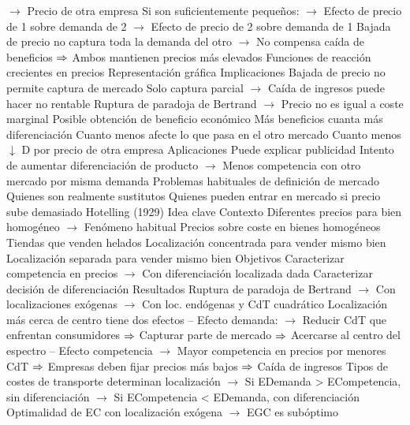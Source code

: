 \documentclass{nuevotema}
\begin{document}
\begin{esquemal}
				\4[] $\to$ Precio de otra empresa
				\4[] Si son suficientemente pequeños:
				\4[] $\to$ Efecto de precio de 1 sobre demanda de 2
				\4[] $\to$ Efecto de precio de 2 sobre demanda de 1
				\4[] Bajada de precio no captura toda la demanda del otro
				\4[] $\to$ No compensa caída de beneficios
				\4[] $\Rightarrow$ Ambos mantienen precios más elevados
				\4[] Funciones de reacción crecientes en precios
				\4 Representación gráfica
				\4[] 
			\3 Implicaciones
				\4 Bajada de precio no permite captura de mercado
				\4[] Solo captura parcial
				\4[] $\to$ Caída de ingresos puede hacer no rentable
				\4 Ruptura de paradoja de Bertrand
				\4[] $\to$ Precio no es igual a coste marginal
				\4 Posible obtención de beneficio económico
				\4 Más beneficios cuanta más diferenciación
				\4[] Cuanto menos afecte lo que pasa en el otro mercado
				\4[] Cuanto menos $\downarrow$ D por precio de otra empresa
			\3 Aplicaciones
				\4 Puede explicar publicidad
				\4[] Intento de aumentar diferenciación de producto
				\4[] $\to$ Menos competencia con otro mercado por misma demanda
				\4 Problemas habituales de definición de mercado
				\4[] Quienes son realmente sustitutos
				\4[] Quienes pueden entrar en mercado si precio sube demasiado
		\2 Hotelling (1929)
			\3 Idea clave
				\4 Contexto
				\4[] Diferentes precios para bien homogéneo
				\4[] $\to$ Fenómeno habitual
				\4[] Precios sobre coste en bienes homogéneos
				\4[] Tiendas que venden helados
				\4[] Localización concentrada para vender mismo bien
				\4[] Localización separada para vender mismo bien
				\4 Objetivos
				\4[] Caracterizar competencia en precios
				\4[] $\to$ Con diferenciación localizada dada
				\4[] Caracterizar decisión de diferenciación
				\4 Resultados
				\4[] Ruptura de paradoja de Bertrand
				\4[] $\to$ Con localizaciones exógenas
				\4[] $\to$ Con loc. endógenas y CdT cuadrático
				\4[] Localización más cerca de centro tiene dos efectos
				\4[] -- Efecto demanda:
				\4[] $\to$ Reducir CdT que enfrentan consumidores
				\4[] $\Rightarrow$ Capturar parte de mercado
				\4[] $\Rightarrow$ Acercarse al centro del espectro
				\4[] -- Efecto competencia
				\4[] $\to$ Mayor competencia en precios por menores CdT
				\4[] $\Rightarrow$ Empresas deben fijar precios más bajos
				\4[] $\Rightarrow$ Caída de ingresos
				\4[] Tipos de costes de transporte determinan localización
				\4[] $\to$ Si EDemanda > ECompetencia, sin diferenciación
				\4[] $\to$ Si ECompetencia < EDemanda, con diferenciación
				\4[] Optimalidad de EC con localización exógena
				\4[] $\to$ EGC es subóptimo

\end{esquemal}
\end{document}
